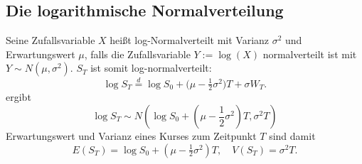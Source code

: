 \subsection{Die logarithmische Normalverteilung}

Seine Zufallsvariable $X$ heißt log-Normalverteilt mit Varianz $\sigma^2$ und Erwartungswert $\mu$, 
falls die Zufallsvariable $Y := \log(X)$ normalverteilt ist mit $Y \sim N(\mu, \sigma^2)$.
$S_T$ ist somit log-normalverteilt:
$$\log S_T \overset{d} = \log S_0 + \big(\mu - \tfrac12 \sigma^2\big)T + \sigma W_T.$$
ergibt
$$\log S_T \sim N\left( \log S_0 + \left( \mu - \frac{1}{2} \sigma^2 \right)T , \sigma^2 T\right)$$
Erwartungswert und Varianz eines Kurses zum Zeitpunkt $T$ sind damit
$$E(S_T)=\log S_0 + (\mu - \tfrac12 \sigma^2)T, \quad V(S_T)=\sigma^2 T.$$
